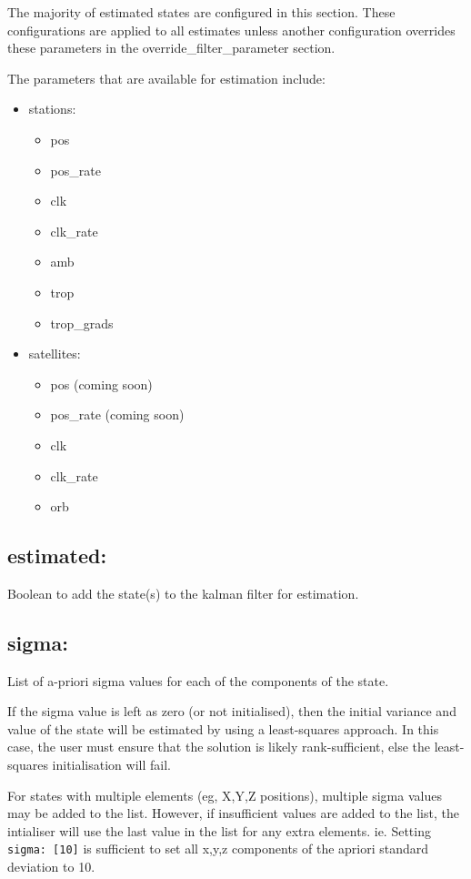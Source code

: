 The majority of estimated states are configured in this section. These configurations are applied to all estimates unless another configuration overrides these parameters in the override\_filter\_parameter section.

The parameters that are available for estimation include:
\begin{itemize}
\item stations:
\begin{itemize}
\item pos
\item pos\_rate
\item clk
\item clk\_rate
\item amb
\item trop
\item trop\_grads
\end{itemize}
\item satellites:
\begin{itemize}
\item pos (coming soon)
\item pos\_rate (coming soon)
\item clk
\item clk\_rate
\item orb
\end{itemize}
\end{itemize}


\subsection*{estimated:}

Boolean to add the state(s) to the kalman filter for estimation.

\subsection*{sigma:}

List of a-priori sigma values for each of the components of the state.

If the sigma value is left as zero (or not initialised), then the initial variance and value of the state will be estimated by using a least-squares approach.
In this case, the user must ensure that the solution is likely rank-sufficient, else the least-squares initialisation will fail.

For states with multiple elements (eg, X,Y,Z positions), multiple sigma values may be added to the list. However, if insufficient values are added to the list, the intialiser will use the last value in the list for any extra elements.
ie. Setting \lstinline{sigma: [10]} is sufficient to set all x,y,z components of the apriori standard deviation to 10.

